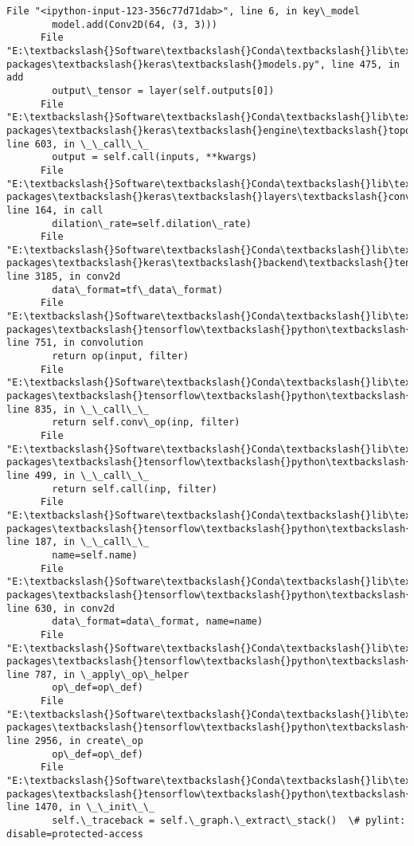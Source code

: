\documentclass[11pt]{article}
\begin{document}
\begin{Verbatim}[commandchars=\\\{\}]
      File "<ipython-input-123-356c77d71dab>", line 6, in key\_model
        model.add(Conv2D(64, (3, 3)))
      File "E:\textbackslash{}Software\textbackslash{}Conda\textbackslash{}lib\textbackslash{}site-packages\textbackslash{}keras\textbackslash{}models.py", line 475, in add
        output\_tensor = layer(self.outputs[0])
      File "E:\textbackslash{}Software\textbackslash{}Conda\textbackslash{}lib\textbackslash{}site-packages\textbackslash{}keras\textbackslash{}engine\textbackslash{}topology.py", line 603, in \_\_call\_\_
        output = self.call(inputs, **kwargs)
      File "E:\textbackslash{}Software\textbackslash{}Conda\textbackslash{}lib\textbackslash{}site-packages\textbackslash{}keras\textbackslash{}layers\textbackslash{}convolutional.py", line 164, in call
        dilation\_rate=self.dilation\_rate)
      File "E:\textbackslash{}Software\textbackslash{}Conda\textbackslash{}lib\textbackslash{}site-packages\textbackslash{}keras\textbackslash{}backend\textbackslash{}tensorflow\_backend.py", line 3185, in conv2d
        data\_format=tf\_data\_format)
      File "E:\textbackslash{}Software\textbackslash{}Conda\textbackslash{}lib\textbackslash{}site-packages\textbackslash{}tensorflow\textbackslash{}python\textbackslash{}ops\textbackslash{}nn\_ops.py", line 751, in convolution
        return op(input, filter)
      File "E:\textbackslash{}Software\textbackslash{}Conda\textbackslash{}lib\textbackslash{}site-packages\textbackslash{}tensorflow\textbackslash{}python\textbackslash{}ops\textbackslash{}nn\_ops.py", line 835, in \_\_call\_\_
        return self.conv\_op(inp, filter)
      File "E:\textbackslash{}Software\textbackslash{}Conda\textbackslash{}lib\textbackslash{}site-packages\textbackslash{}tensorflow\textbackslash{}python\textbackslash{}ops\textbackslash{}nn\_ops.py", line 499, in \_\_call\_\_
        return self.call(inp, filter)
      File "E:\textbackslash{}Software\textbackslash{}Conda\textbackslash{}lib\textbackslash{}site-packages\textbackslash{}tensorflow\textbackslash{}python\textbackslash{}ops\textbackslash{}nn\_ops.py", line 187, in \_\_call\_\_
        name=self.name)
      File "E:\textbackslash{}Software\textbackslash{}Conda\textbackslash{}lib\textbackslash{}site-packages\textbackslash{}tensorflow\textbackslash{}python\textbackslash{}ops\textbackslash{}gen\_nn\_ops.py", line 630, in conv2d
        data\_format=data\_format, name=name)
      File "E:\textbackslash{}Software\textbackslash{}Conda\textbackslash{}lib\textbackslash{}site-packages\textbackslash{}tensorflow\textbackslash{}python\textbackslash{}framework\textbackslash{}op\_def\_library.py", line 787, in \_apply\_op\_helper
        op\_def=op\_def)
      File "E:\textbackslash{}Software\textbackslash{}Conda\textbackslash{}lib\textbackslash{}site-packages\textbackslash{}tensorflow\textbackslash{}python\textbackslash{}framework\textbackslash{}ops.py", line 2956, in create\_op
        op\_def=op\_def)
      File "E:\textbackslash{}Software\textbackslash{}Conda\textbackslash{}lib\textbackslash{}site-packages\textbackslash{}tensorflow\textbackslash{}python\textbackslash{}framework\textbackslash{}ops.py", line 1470, in \_\_init\_\_
        self.\_traceback = self.\_graph.\_extract\_stack()  \# pylint: disable=protected-access
    

\end{Verbatim}
\end{document}
